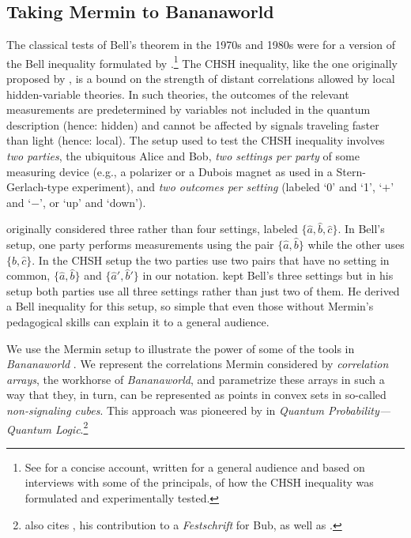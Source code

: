
\subsection{Taking Mermin to Bananaworld} \label{1.1}

The classical tests of Bell's theorem in the 1970s and 1980s were for a version of the Bell inequality formulated by \citet{CHSH}.\footnote{See \citet[Chs.\ 29--31, pp.\ 250--289]{Gilder 2008} for a concise account, written for a general audience and based on interviews with some of the principals, of how the CHSH inequality was formulated and experimentally tested.} The CHSH inequality, like the one originally proposed by \citet{Bell 1964}, is a bound on the strength of distant correlations allowed by local hidden-variable theories. In such theories, the outcomes of the relevant measurements are predetermined by variables not included in the quantum description (hence: hidden) and cannot be affected by signals traveling faster than light (hence: local). The setup used to test the CHSH inequality involves \emph{two parties}, the ubiquitous Alice and Bob, \emph{two settings per party} of some measuring device (e.g., a polarizer or a Dubois magnet as used in a Stern-Gerlach-type experiment), and \emph{two outcomes per setting} (labeled `0' and `1', `$+$' and `$-$', or `up' and `down'). 

\citet[pp.\ 18--19]{Bell 1964} originally considered three rather than four settings, labeled $\{\hat{a}, \hat{b}, \hat{c}\}$. 
In Bell's setup, one party performs measurements using the pair $\{\hat{a}, \hat{b}\}$ while the other uses $\{\hat{b}, \hat{c}\}$. In the CHSH setup the two parties use two pairs that have no setting in common, $\{\hat{a}, \hat{b}\}$ and $\{\hat{a}', \hat{b}'\}$ in our notation. \citet{Mermin 1981, Mermin 1988} kept Bell's three settings but in his setup both parties use all three settings rather than just two of them. He derived a Bell inequality for this setup, so simple that even those without Mermin's pedagogical skills can explain it to a general audience. 

We use the Mermin setup to illustrate the power of some of the tools in \emph{Bananaworld} \citep{Bub 2016}. We represent the correlations Mermin considered by \emph{correlation arrays}, the workhorse of \emph{Bananaworld}, and parametrize these arrays in such a way that they, in turn, can be represented as points in convex sets in so-called \emph{non-signaling cubes}. This approach was pioneered by \citet{Pitowsky 1989b} in \emph{Quantum Probability---Quantum Logic}.\footnote{\citet[p.\ 120]{Bub 2016} also cites \citet{Pitowsky 2006}, his contribution to a \emph{Festschrift} for Bub, as well as \citet{Pitowsky 1986,Pitowsky 1989a,Pitowsky 1991,Pitowsky 2008}.} 

